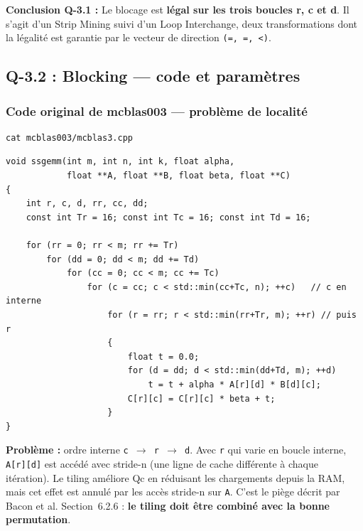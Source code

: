 \documentclass[a4paper,11pt]{article}
\newcommand{\code}[1]{\texttt{\color{CodeRed}#1}}
\begin{document}
\begin{successbox}
  \textbf{Conclusion Q-3.1 :} Le blocage est \textbf{l\'egal sur les trois boucles r, c
  et d}. Il s'agit d'un Strip Mining suivi d'un Loop Interchange, deux transformations
  dont la l\'egalit\'e est garantie par le vecteur de direction \texttt{(=, =, <)}.
\end{successbox}

\subsection{Q-3.2 : Blocking --- code et param\`etres}

\subsubsection{Code original de mcblas003 --- probl\`eme de localit\'e}

\begin{lstlisting}[style=bash]
cat mcblas003/mcblas3.cpp
\end{lstlisting}

\begin{lstlisting}[style=cpp, caption={mcblas003 --- Code original (Tr=Tc=Td=16, ordre interne c\,$\to$\,r\,$\to$\,d)}]
void ssgemm(int m, int n, int k, float alpha,
            float **A, float **B, float beta, float **C)
{
    int r, c, d, rr, cc, dd;
    const int Tr = 16; const int Tc = 16; const int Td = 16;

    for (rr = 0; rr < m; rr += Tr)
        for (dd = 0; dd < m; dd += Td)
            for (cc = 0; cc < m; cc += Tc)
                for (c = cc; c < std::min(cc+Tc, n); ++c)   // c en interne
                    for (r = rr; r < std::min(rr+Tr, m); ++r) // puis r
                    {
                        float t = 0.0;
                        for (d = dd; d < std::min(dd+Td, m); ++d)
                            t = t + alpha * A[r][d] * B[d][c];
                        C[r][c] = C[r][c] * beta + t;
                    }
}
\end{lstlisting}

\textbf{Probl\`eme :} ordre interne \code{c\,$\to$\,r\,$\to$\,d}. Avec \code{r} qui varie
en boucle interne, \code{A[r][d]} est acc\'ed\'e avec stride-n (une ligne de cache
diff\'erente \`a chaque it\'eration). Le tiling am\'eliore Qc en r\'eduisant les
chargements depuis la RAM, mais cet effet est annul\'e par les acc\`es stride-n sur
\code{A}. C'est le pi\`ege d\'ecrit par Bacon et al. Section~6.2.6 : \textbf{le tiling
doit \^etre combin\'e avec la bonne permutation}.
\end{document}
